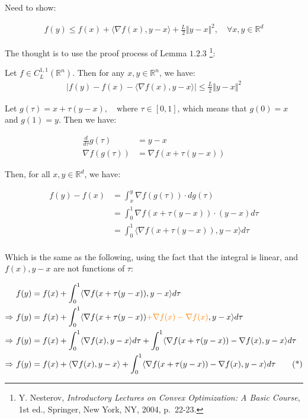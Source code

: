 \documentclass{article}
\begin{document}
Need to show:

\begin{align*}
    f ( y ) \leq f ( x ) + \langle \nabla f ( x ), y - x \rangle + \frac{L}{2} \Vert y - x \Vert^2 , \quad \forall x, y \in \mathbb{R}^d
\end{align*}

The thought is to use the proof process of Lemma $1.2.3$
\footnote{Y. Nesterov, \textit{Introductory Lectures on Convex Optimization: A Basic Course}, 1st ed., Springer, New York, NY, 2004, p.~22-23.}:

\begin{tcolorbox}[greenbox, title = Lemma 1.2.3]
    Let $f \in C^{1,1}_L(\mathbb{R}^n)$. Then for any $x, y \in \mathbb{R}^n$, we have:
    \begin{align*}
        |f ( y ) - f ( x ) - \langle \nabla f ( x ), y - x \rangle| \leq \frac{L}{2} \Vert y - x \Vert^2
    \end{align*}
\end{tcolorbox}

Let $g(\tau) = x + \tau (y - x), \quad \text{where } \tau \in [0, 1]$, 
which means that $g(0) = x$ and $g(1) = y$.
Then we have:

\begin{align*}
    \frac{d}{d\tau} g(\tau) &= y - x \\
    \nabla f ( g(\tau) ) &= \nabla f ( x + \tau ( y - x ) ) 
\end{align*}

Then, for all $x, y \in \mathbb{R}^d$, we have:

\begin{align*}
    f(y) - f(x) 
    &= \int^{y}_{x} \nabla f ( g(\tau) ) \cdot d g(\tau) \\
    &= \int^{1}_{0} \nabla f ( x + \tau ( y - x ) ) \cdot ( y - x ) d\tau \\
    &= \int^{1}_{0} \langle \nabla f ( x + \tau ( y - x ) ) , y - x \rangle d\tau \\
\end{align*}

Which is the same as the following, using the fact that the integral is linear, and $f ( x ), y - x$ are not functions of $\tau$:

\begin{align*}
    &f(y) = f(x) + \int^{1}_{0} \langle \nabla f ( x + \tau ( y - x ) ) , y - x \rangle d\tau \\
    \Rightarrow \ &f(y) = f(x) + \int_0^1 \langle \nabla f ( x + \tau ( y - x ) ) \textcolor{orange}{+ \nabla f ( x ) - \nabla f ( x )}, y - x \rangle d\tau \\
    \Rightarrow \ &f(y) = f(x) + \int_0^1 \langle \nabla f ( x ), y - x \rangle d\tau + \int_0^1 \langle \nabla f ( x + \tau ( y - x ) ) - \nabla f ( x ), y - x \rangle d\tau \\
    \Rightarrow \ &f(y) = f(x) + \langle \nabla f ( x ), y - x \rangle + \int_0^1 \langle \nabla f ( x + \tau ( y - x ) ) - \nabla f ( x ), y - x \rangle d\tau \tag{*}
\end{align*}
\end{document}
